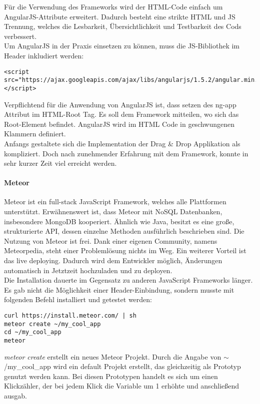 Für die Verwendung des Frameworks wird der HTML-Code einfach um AngularJS-Attribute erweitert. Dadurch besteht eine strikte HTML und JS Trennung, welches die Lesbarkeit, Übersichtlichkeit und Testbarkeit des Cods verbessert. \cite{ANGULARJS}\\

Um AngularJS in der Praxis einsetzen zu können, muss die JS-Bibliothek im Header inkludiert werden: 
\begin{lstlisting}[caption={AngularJS einbinden\cite{ANGULARJSDOWN}}]
<script 
src="https://ajax.googleapis.com/ajax/libs/angularjs/1.5.2/angular.min.js">
</script>
\end{lstlisting}

Verpflichtend für die Anwendung von AngularJS ist, dass setzen des ng-app Attribut im HTML-Root Tag. Es soll dem Framework mitteilen, wo sich das Root-Element befindet. AngularJS wird im HTML Code in geschwungenen Klammern definiert.\\
Anfangs gestaltete sich die Implementation der Drag \& Drop Applikation als kompliziert. Doch nach zunehmender Erfahrung mit dem Framework, konnte in sehr kurzer Zeit viel erreicht werden.

\paragraph{Meteor}
Meteor ist ein full-stack JavaScript Framework, welches alle Plattformen unterstützt. Erwähnenswert ist, dass Meteor mit NoSQL Datenbanken, insbesondere MongoDB kooperiert. Ähnlich wie Java, besitzt es eine große, strukturierte API, dessen einzelne Methoden ausführlich beschrieben sind. Die Nutzung von Meteor ist frei. Dank einer eigenen Community, namens Meteorpedia, steht einer Problemlösung nichts im Weg. Ein weiterer Vorteil ist das live deploying. Dadurch wird dem Entwickler möglich, Änderungen automatisch in Jetztzeit hochzuladen und zu deployen. \cite{METEOR}\\

Die Installation dauerte im Gegensatz zu anderen JavaScript Frameworks länger. Es gab nicht die Möglichkeit einer Header-Einbindung, sondern musste mit folgenden Befehl installiert und getestet werden:
\begin{lstlisting}[caption={Installation von Meteor \cite{METEORINSTALL}}]
curl https://install.meteor.com/ | sh
meteor create ~/my_cool_app
cd ~/my_cool_app
meteor
\end{lstlisting}

\textit{meteor create} erstellt ein neues Meteor Projekt. Durch die Angabe von $\sim$/my\_cool\_app wird ein default Projekt erstellt, das gleichzeitig als Prototyp genutzt werden kann. Bei diesen Prototypen handelt es sich um einen Klickzähler, der bei jedem Klick die Variable um 1 erhöhte und anschließend ausgab.


